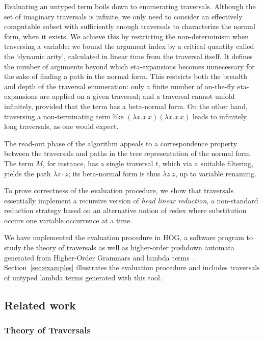 \documentclass{elsarticle}
\theoremstyle{plain}
\theoremstyle{definition}
\begin{document}
Evaluating an untyped term boils down to enumerating traversals.
 Although the set of imaginary traversals is infinite, we only need to consider an effectively computable subset with sufficiently enough traversals to characterize the normal form, when it exists.
We achieve this by restricting the non-determinism when traversing a variable: we bound the argument index by a critical quantity called the `dynamic arity', calculated in linear time from the traversal itself. It defines the number of arguments beyond which eta-expansions becomes unnecessary for the sake of finding a path in the normal form. This restricts both the breadth and depth of the traversal enumeration: only a finite number of on-the-fly eta-expansions are applied on a given traversal; and a traversal cannot unfold infinitely, provided that the term has a beta-normal form.
On the other hand, traversing a non-terminating term like $(\lambda x. x\,x)(\lambda x. x\,x)$ leads to infinitely long traversals, as one would expect.

The read-out phase of the algorithm appeals to a correspondence property between the traversals and paths in the tree representation of the normal form. The term $M$, for instance, has a single traversal $t$, which via a suitable filtering, yields the path $\lambda z \cdot z$; its beta-normal form is thus $\lambda z. z$, up to variable renaming.

 To prove correctness of the evaluation procedure, we show that traversals essentially implement a recursive version of \emph{head linear reduction}, a non-standard reduction strategy based on an alternative notion of redex
  where substitution occurs one variable occurrence at a time.

 We have implemented the evaluation procedure in HOG, a software program to study the theory of traversals as well as higher-order pushdown automata generated from Higher-Order Grammars and lambda terms~\cite{BlumGalop2008,Blum-HogTool}.  Section~\ref{sec:examples} illustrates the evaluation procedure and includes traversals of untyped lambda terms generated with this tool.

\subsection{Related work}

\subsubsection{Theory of Traversals}
\end{document}
